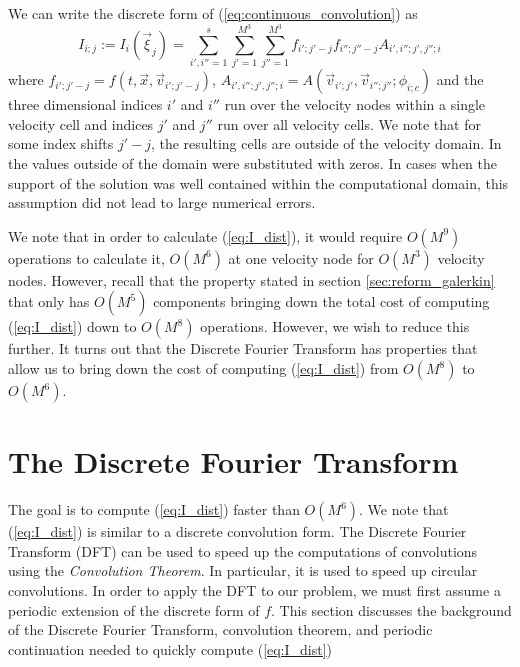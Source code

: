 \documentclass[12pt]{CSUNthesis}
\begin{document}
We can write the discrete form of (\ref{eq:continuous_convolution}) as 
\begin{equation}
\label{eq:I_dist}
I_{i;j}:=I_{i}(\vec{\xi}_{j}) = \sum_{i',i''=1}^s  \sum_{j'=1}^{M^3} \sum_{j''=1}^{M^3} f_{i';j'-j} f_{i'';j''-j} A_{i',i'';j',j'';i} 
\end{equation}
where $f_{i';j'-j}=f(t,\vec{x},\vec{v}_{i';j'-j})$, 
$A_{i',i'';j',j'';i}=A(\vec{v}_{i';j'},\vec{v}_{i'';j''}; \phi_{i;c})$ and the three dimensional 
indices $i'$ and $i''$ run over the velocity nodes within a single velocity cell 
and indices $j'$ and $j''$ run over all velocity cells. We note that for some index 
shifts $j'-j$, the resulting cells are outside of the velocity domain. 
In \cite{AlekseenkoJosyula2012a} the values outside of the domain 
were substituted with zeros. In cases when the support of the solution 
was well contained within the computational domain, this assumption did not lead to 
large numerical errors. 

We note that in order to calculate (\ref{eq:I_dist}), it would require $O(M^9)$ operations to calculate it, $O(M^6)$ at one velocity node for $O(M^3)$ velocity nodes. However, recall that the property stated in section \ref{sec:reform_galerkin} that only has $O(M^5)$ components bringing down the total cost of computing (\ref{eq:I_dist}) down to $O(M^8)$ operations. However, we wish to reduce this further. It turns out that the Discrete Fourier Transform has properties that allow us to bring down the cost of computing (\ref{eq:I_dist}) from $O(M^8)$ to $O(M^6)$.


\chapter{The Discrete Fourier Transform}

The goal is to compute (\ref{eq:I_dist}) faster than $O(M^6)$. We note that (\ref{eq:I_dist}) is similar to a discrete convolution form. The Discrete Fourier Transform (DFT) can be used to speed up the computations of convolutions using the \textit{Convolution Theorem}. In particular, it is used to speed up circular convolutions. In order to apply the DFT to our problem, we must first assume a periodic extension of the discrete form of $f$. This section discusses the background of the Discrete Fourier Transform, convolution theorem, and periodic continuation needed to quickly compute (\ref{eq:I_dist}) 
\end{document}
